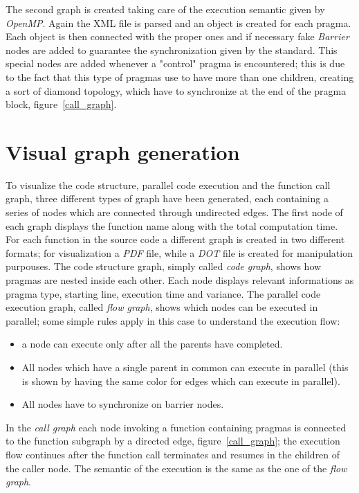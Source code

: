 \documentclass[a4paper,11pt,oneside]{book}
\begin{document}
The second graph is created taking care of the execution semantic given by \emph{OpenMP}. Again the XML file is parsed and an object is created for each pragma. Each object is then connected with the proper ones and if necessary fake \emph{Barrier} nodes are added to guarantee the synchronization given by the standard. This special nodes are added whenever a "control" pragma is encountered; this is due to the fact that this type of pragmas use to have more than one children, creating a sort of diamond topology, which have to synchronize at the end of the pragma block, figure~\ref{call_graph}.

\section{Visual graph generation}

To visualize the code structure, parallel code execution and the function call graph, three different types of graph have been generated, each containing a series of nodes which are connected through undirected edges. The first node of each graph displays the function name along with the total computation time. For each function in the source code a different graph is created in two different formats; for visualization a \emph{PDF} file, while a \emph{DOT} file is created for manipulation purpouses. The code structure graph, simply called \emph{code graph}, shows how pragmas are nested inside each other. Each node displays relevant informations as pragma type, starting line, execution time and variance. The parallel code execution graph, called \emph{flow graph}, shows which nodes can be executed in parallel; some simple rules apply in this case to understand the execution flow:
\begin{itemize}
\item{a node can execute only after all the parents have completed.}
\item{All nodes which have a single parent in common can execute in parallel (this is shown by having the same color for edges which can execute in parallel).}
\item{All nodes have to synchronize on barrier nodes.}
\end{itemize}
In the \emph{call graph} each node invoking a function containing pragmas is connected to the function subgraph by a directed edge, figure~\ref{call_graph}; the execution flow continues after the function call terminates and resumes in the children of the caller node. The semantic of the execution is the same as the one of the \emph{flow graph}.
\end{document}

